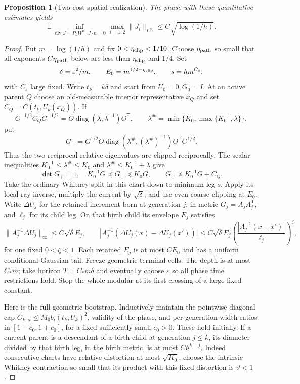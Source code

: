 \documentclass[11pt]{article}
\newtheorem{proposition}[theorem]{Proposition}
\newcommand{\E}{\mathbb E}
\numberwithin{equation}{section}
\begin{document}
\begin{proposition}[Two-cost spatial realization]\label{pair:prop:flow}
The phase with these quantitative estimates yields
\[
 \E\inf_{\operatorname{div}J=P_hW^0,\ J\cdot n=0}
 \max_{i=1,2}\|J_i\|_{L^{\psi_i}}
 \le C\sqrt{\log(1/h)}.
\]
\end{proposition}
\begin{proof}
Put $m=\log(1/h)$ and fix $0<\eta_{\rm clip}<1/10$.
Choose $\eta_{\rm path}$ so small that all exponents
$C\eta_{\rm path}$ below are less than $\eta_{\rm clip}$ and $1/4$.
Set
\[
 \delta=\varepsilon^2/m,\qquad E_0=m^{1/2-\eta_{\rm clip}},
 \qquad s=hm^{C_s},
\]
with $C_s$ large fixed. Write $t_k=k\delta$ and start from $U_0=0,G_0=I$.
At an active parent $Q$ choose an old-measurable interior representative
$x_Q$ and set $C_Q=C(t_k,U_k(x_Q))$. If
\[
 G^{-1/2}C_QG^{-1/2}
 =O\operatorname{diag}(\lambda,\lambda^{-1})O^{\mathsf T},
 \qquad
 \lambda^\#=\min\{K_0,\max\{K_0^{-1},\lambda\}\},
\]
put
\[
 G_+=G^{1/2}O\operatorname{diag}
       (\lambda^\#,(\lambda^\#)^{-1})O^{\mathsf T}G^{1/2}.
\]
Thus the two reciprocal relative eigenvalues are clipped reciprocally.
The scalar inequalities
$K_0^{-1}\le\lambda^\#\le K_0$ and
$\lambda^\#\le K_0^{-1}+\lambda$ give
\[
 \det G_+=1,\quad K_0^{-1}G\preceq G_+\preceq K_0G,\qquad
 G_+\preceq K_0^{-1}G+C_Q.
\]
Take the ordinary Whitney split in this chart down to minimum leg $s$.
Apply its local ray inverse, multiply the current by $\sqrt\delta$,
and use even coarse clipping at $E_0$. Write $\Delta U_j$ for the
retained increment born at generation $j$, in metric
$G_j=A_jA_j^{\mathsf T}$, and $\ell_j$ for its child leg.
On that birth child its envelope $E_j$ satisfies
\[
 \|A_j^{-1}\Delta U_j\|_\infty\le C\sqrt\delta E_j,\qquad
 |A_j^{-1}(\Delta U_j(x)-\Delta U_j(x'))|
 \le C\sqrt\delta E_j
       \left(\frac{|A_j^{-1}(x-x')|}{\ell_j}\right)^\zeta ,
\]
for one fixed $0<\zeta<1$. Each retained $E_j$ is at most $CE_0$
and has a uniform conditional Gaussian tail.
Freeze geometric terminal cells. The depth is at most $C_*m$;
take horizon $T=C_*m\delta$ and eventually choose $\varepsilon$ so
all phase time restrictions hold. Stop the whole modular at its first
crossing of a large fixed constant.

Here is the full geometric bootstrap. Inductively maintain the
pointwise diagonal cap $G_{k,ii}\le M_0b_i(t_k,U_k)^2$, validity of
the phase, and per-generation width ratios in $[1-c_0,1+c_0]$,
for a fixed sufficiently small $c_0>0$. These hold initially.
If a current parent is a descendant of a birth child at generation
$j\le k$, its diameter divided by that birth leg, in the birth
metric, is at most $C\vartheta^{k-j}$.
Indeed consecutive charts have relative distortion at most
$\sqrt{K_0}$; choose the intrinsic Whitney contraction so small
that its product with this fixed distortion is $\vartheta<1$.


\end{proof}
\end{document}
